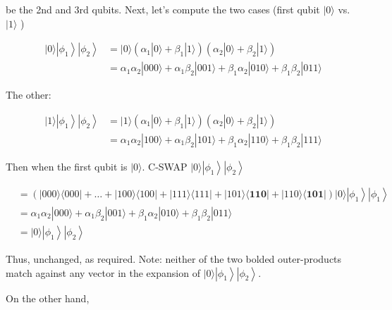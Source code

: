 \documentclass[main.tex]{subfiles}
\begin{document}
    be the 2nd and 3rd qubits. Next, let's compute the two cases (first qubit $|0\rangle$ vs. $|1\rangle$ )

    $$
    \begin{aligned}
    |0\rangle\left|\phi_{1}\right\rangle\left|\phi_{2}\right\rangle &=|0\rangle\left(\alpha_{1}|0\rangle+\beta_{1}|1\rangle\right)\left(\alpha_{2}|0\rangle+\beta_{2}|1\rangle\right) \\
    &=\alpha_{1} \alpha_{2}|000\rangle+\alpha_{1} \beta_{2}|001\rangle+\beta_{1} \alpha_{2}|010\rangle+\beta_{1} \beta_{2}|011\rangle
    \end{aligned}
    $$
    
    The other:
    
    $$
    \begin{aligned}
    |1\rangle\left|\phi_{1}\right\rangle\left|\phi_{2}\right\rangle &=|1\rangle\left(\alpha_{1}|0\rangle+\beta_{1}|1\rangle\right)\left(\alpha_{2}|0\rangle+\beta_{2}|1\rangle\right) \\
    &=\alpha_{1} \alpha_{2}|100\rangle+\alpha_{1} \beta_{2}|101\rangle+\beta_{1} \alpha_{2}|110\rangle+\beta_{1} \beta_{2}|111\rangle
    \end{aligned}
    $$
    
    Then when the first qubit is $|0\rangle$. C-SWAP $|0\rangle\left|\phi_{1}\right\rangle\left|\phi_{2}\right\rangle$
    
    $$
    \begin{aligned}
    &=(|000\rangle\langle 000|+\ldots+| 100\rangle\langle 100|+| 111\rangle\langle 111|+| 101\rangle\langle\mathbf{1 1 0}|+| 110\rangle\langle\mathbf{1 0 1}|)|0\rangle\left|\phi_{1}\right\rangle\left|\phi_{1}\right\rangle \\
    &=\alpha_{1} \alpha_{2}|000\rangle+\alpha_{1} \beta_{2}|001\rangle+\beta_{1} \alpha_{2}|010\rangle+\beta_{1} \beta_{2}|011\rangle \\
    &=|0\rangle\left|\phi_{1}\right\rangle\left|\phi_{2}\right\rangle
    \end{aligned}
    $$
    
    Thus, unchanged, as required. Note: neither of the two bolded outer-products match against any vector in the expansion of $|0\rangle\left|\phi_{1}\right\rangle\left|\phi_{2}\right\rangle$.
    
    On the other hand,
    
\end{document}
